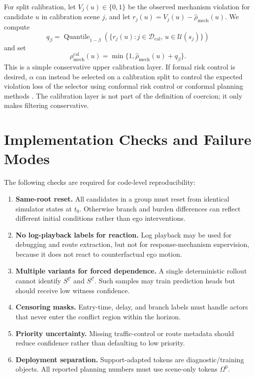 \documentclass[10pt]{article}
\newcommand{\cC}{\mathcal{C}}
\newcommand{\cD}{\mathcal{D}}
\newcommand{\cU}{\mathcal{U}}
\begin{document}
For split calibration, let \(V_j(u)\in\{0,1\}\) be the observed mechanism violation for candidate \(u\) in calibration scene \(j\), and let \(r_j(u)=V_j(u)-\hat\rho_{\mathrm{mech}}(u)\). We compute
\begin{equation}
    q_\beta
    =
    \operatorname{Quantile}_{1-\beta}
    \left(
    \{r_j(u): j\in\cD_{\mathrm{cal}},\,u\in\cU(s_j)\}
    \right)
    \label{eq:appendix_cal_quantile}
\end{equation}
and set
\begin{equation}
    \rho_{\mathrm{mech}}^{\mathrm{cal}}(u)
    =
    \min\{1,\hat\rho_{\mathrm{mech}}(u)+q_\beta\}.
    \label{eq:appendix_cal_risk}
\end{equation}
This is a simple conservative upper calibration layer. If formal risk control is desired, \(\alpha\) can instead be selected on a calibration split to control the expected violation loss of the selector using conformal risk control or conformal planning methods \parencite{angelopoulos2024conformal,lindemann2023safe,dixit2023adaptive}. The calibration layer is not part of the definition of coercion; it only makes filtering conservative.

\section{Implementation Checks and Failure Modes}
\label{app:implementation_checks}

The following checks are required for code-level reproducibility:
\begin{enumerate}[leftmargin=*]
    \item \textbf{Same-root reset.} All candidates in a group must reset from identical simulator states at \(t_0\). Otherwise branch and burden differences can reflect different initial conditions rather than ego interventions.
    \item \textbf{No log-playback labels for reaction.} Log playback may be used for debugging and route extraction, but not for response-mechanism supervision, because it does not react to counterfactual ego motion.
    \item \textbf{Multiple variants for forced dependence.} A single deterministic rollout cannot identify \(S^{\cC}\) and \(S^{\bar{\cC}}\). Such samples may train prediction heads but should receive low witness confidence.
    \item \textbf{Censoring masks.} Entry-time, delay, and branch labels must handle actors that never enter the conflict region within the horizon.
    \item \textbf{Priority uncertainty.} Missing traffic-control or route metadata should reduce confidence rather than defaulting to low priority.
    \item \textbf{Deployment separation.} Support-adapted tokens are diagnostic/training objects. All reported planning numbers must use scene-only tokens \(\Omega^0\).
\end{enumerate}
\end{document}
